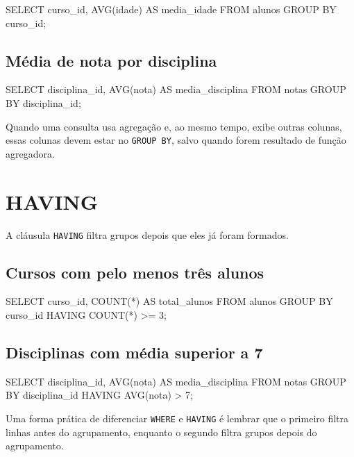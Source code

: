 \begin{sqlcode}
SELECT
    curso_id,
    AVG(idade) AS media_idade
FROM alunos
GROUP BY curso_id;
\end{sqlcode}

\subsection{Média de nota por disciplina}

\begin{sqlcode}
SELECT
    disciplina_id,
    AVG(nota) AS media_disciplina
FROM notas
GROUP BY disciplina_id;
\end{sqlcode}

\begin{observacao}
Quando uma consulta usa agregação e, ao mesmo tempo, exibe outras colunas, essas colunas devem estar no \texttt{GROUP BY}, salvo quando forem resultado de função agregadora.
\end{observacao}

\section{HAVING}

A cláusula \texttt{HAVING} filtra grupos depois que eles já foram formados.

\subsection{Cursos com pelo menos três alunos}

\begin{sqlcode}
SELECT
    curso_id,
    COUNT(*) AS total_alunos
FROM alunos
GROUP BY curso_id
HAVING COUNT(*) >= 3;
\end{sqlcode}

\subsection{Disciplinas com média superior a 7}

\begin{sqlcode}
SELECT
    disciplina_id,
    AVG(nota) AS media_disciplina
FROM notas
GROUP BY disciplina_id
HAVING AVG(nota) > 7;
\end{sqlcode}

\begin{quadro_dica}
Uma forma prática de diferenciar \texttt{WHERE} e \texttt{HAVING} é lembrar que o primeiro filtra linhas antes do agrupamento, enquanto o segundo filtra grupos depois do agrupamento.
\end{quadro_dica}

